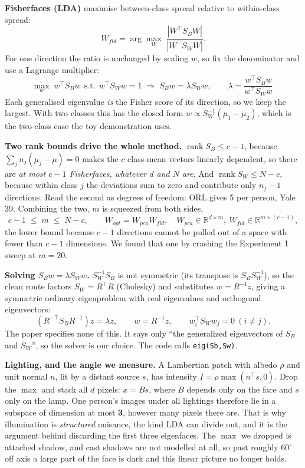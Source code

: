 \documentclass[11pt]{article}
\newcommand{\T}{^{\top}}
\begin{document}
\textbf{Fisherfaces (LDA)} maximise between-class spread relative to within-class spread:
\[ W_{fld}=\arg\max_W\;\frac{|W\T S_BW|}{|W\T S_WW|}. \]
For one direction the ratio is unchanged by scaling $w$, so fix the denominator and use a Lagrange multiplier:
\[ \max_w\; w\T S_Bw\ \ \text{s.t.}\ \ w\T S_Ww=1\;\Longrightarrow\; S_Bw=\lambda S_Ww,\qquad \lambda=\frac{w\T S_Bw}{w\T S_Ww}. \]
Each generalised eigenvalue \emph{is} the Fisher score of its direction, so we keep the largest. With two classes this has the closed form $w\propto S_W^{-1}(\mu_1-\mu_2)$, which is the two-class case the toy demonstration uses.

\textbf{Two rank bounds drive the whole method.} $\operatorname{rank}S_B\le c-1$, because $\sum_jn_j(\mu_j-\mu)=0$ makes the $c$ class-mean vectors linearly dependent, so there are \emph{at most $c-1$ Fisherfaces, whatever $d$ and $N$ are}. And $\operatorname{rank}S_W\le N-c$, because within class $j$ the deviations sum to zero and contribute only $n_j-1$ directions. Read the second as degrees of freedom: ORL gives 5 per person, Yale 39. Combining the two, $m$ is squeezed from both sides,
\[ c-1\;\le\;m\;\le\;N-c,\qquad W_{opt}=W_{pca}W_{fld},\quad W_{pca}\in\mathbb R^{d\times m},\ W_{fld}\in\mathbb R^{m\times(c-1)}, \]
the lower bound because $c-1$ directions cannot be pulled out of a space with fewer than $c-1$ dimensions. We found that one by crashing the Experiment 1 sweep at $m=20$.

\textbf{Solving $S_Bw=\lambda S_Ww$.} $S_W^{-1}S_B$ is not symmetric (its transpose is $S_BS_W^{-1}$), so the clean route factors $S_W=R\T R$ (Cholesky) and substitutes $w=R^{-1}z$, giving a symmetric ordinary eigenproblem with real eigenvalues and orthogonal eigenvectors:
\[ \left(R^{-\top}S_BR^{-1}\right)z=\lambda z,\qquad w=R^{-1}z,\qquad w_i\T S_Ww_j=0\ (i\ne j). \]
The paper specifies none of this. It says only ``the generalized eigenvectors of $S_B$ and $S_W$'', so the solver is our choice. The code calls \texttt{eig(Sb,Sw)}.


\textbf{Lighting, and the angle we measure.} A Lambertian patch with albedo $\rho$ and unit normal $n$, lit by a distant source $s$, has intensity $I=\rho\max(n\T s,0)$. Drop the $\max$ and stack all $d$ pixels: $x=Bs$, where $B$ depends only on the face and $s$ only on the lamp. One person's images under all lightings therefore lie in a subspace of dimension at most \textbf{3}, however many pixels there are. That is why illumination is \emph{structured} nuisance, the kind LDA can divide out, and it is the argument behind discarding the first three eigenfaces. The $\max$ we dropped is attached shadow, and cast shadows are not modelled at all, so past roughly $60^\circ$ off axis a large part of the face is dark and this linear picture no longer holds.
\end{document}
